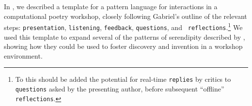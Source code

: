 In \cite{serendipity-arxiv}, we described a template for a pattern
language for interactions in a computational poetry workshop, closely
following Gabriel's outline of the relevant steps: {\tt presentation},
{\tt listening}, {\tt feedback}, {\tt questions}, and {\tt
  reflections}.\footnote{To this should be added the potential for
  real-time {\tt replies} by critics to {\tt questions} asked by the
  presenting author, before subsequent ``offline'' {\tt reflections}.}
We used this template to expand several of the patterns of serendipity
described by \cite{van1994anatomy}, showing how they could be used to
foster discovery and invention in a workshop environment.



